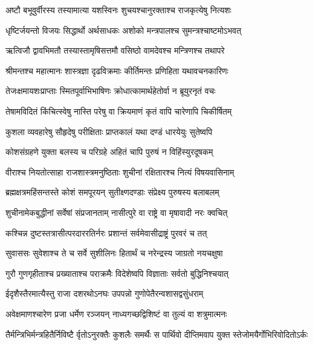 
\twolineshloka
{अष्टौ बभूवुर्वीरस्य तस्यामात्या यशस्विनः}
{शुचयश्चानुरक्ताश्च राजकृत्येषु नित्यशः} %

\twolineshloka
{धृष्टिर्जयन्तो विजयः सिद्धार्थो अर्थसाधकः}
{अशोको मन्त्रपालश्च सुमन्त्रश्चाष्टमोऽभवत्} %

\twolineshloka
{ऋत्विजौ द्वावभिमतौ तस्यास्तामृषिसत्तमौ}
{वसिष्ठो वामदेवश्च मन्त्रिणश्च तथापरे} %

\twolineshloka
{श्रीमन्तश्च महात्मानः शास्त्रज्ञा दृढविक्रमाः}
{कीर्तिमन्तः प्रणिहिता यथावचनकारिणः} %

\twolineshloka
{तेजःक्षमायशःप्राप्ताः स्मितपूर्वाभिभाषिणः}
{क्रोधात्कामार्थहेतोर्वा न ब्रूयुरनृतं वचः} %

\twolineshloka
{तेषामविदितं किंचित्स्वेषु नास्ति परेषु वा}
{क्रियमाणं कृतं वापि चारेणापि चिकीर्षितम्} %

\twolineshloka
{कुशला व्यवहारेषु सौहृदेषु परीक्षिताः}
{प्राप्तकालं यथा दण्डं धारयेयुः सुतेष्वपि} %

\twolineshloka
{कोशसंग्रहणे युक्ता बलस्य च परिग्रहे}
{अहितं चापि पुरुषं न विहिंस्युरदूषकम्} %

\twolineshloka
{वीराश्च नियतोत्साहा राजशास्त्रमनुष्ठिताः}
{शुचीनां रक्षितारश्च नित्यं विषयवासिनाम्} %

\twolineshloka
{ब्रह्मक्षत्रमहिंसन्तस्ते कोशं समपूरयन्}
{सुतीक्ष्णदण्डाः संप्रेक्ष्य पुरुषस्य बलाबलम्} %

\twolineshloka
{शुचीनामेकबुद्धीनां सर्वेषां संप्रजानताम्}
{नासीत्पुरे वा राष्ट्रे वा मृषावादी नरः क्वचित्} %

\twolineshloka
{कश्चिन्न दुष्टस्तत्रासीत्परदाररतिर्नरः}
{प्रशान्तं सर्वमेवासीद्राष्ट्रं पुरवरं च तत्} %

\twolineshloka
{सुवाससः सुवेशाश्च ते च सर्वे सुशीलिनः}
{हितार्थं च नरेन्द्रस्य जाग्रतो नयचक्षुषा} %

\twolineshloka
{गुरौ गुणगृहीताश्च प्रख्याताश्च पराक्रमैः}
{विदेशेष्वपि विज्ञाताः सर्वतो बुद्धिनिश्चयात्} %

\twolineshloka
{ईदृशैस्तैरमात्यैस्तु राजा दशरथोऽनघः}
{उपपन्नो गुणोपेतैरन्वशासद्वसुंधराम्} %

\twolineshloka
{अवेक्षमाणश्चारेण प्रजा धर्मेण रञ्जयन्}
{नाध्यगच्छद्विशिष्टं वा तुल्यं वा शत्रुमात्मनः} %

\fourlineindentedshloka
{तैर्मन्त्रिभिर्मन्त्रहितैर्निविष्टै}
{र्वृतोऽनुरक्तैः कुशलैः समर्थैः}
{स पार्थिवो दीप्तिमवाप युक्त}
{स्तेजोमयैर्गोभिरिवोदितोऽर्कः} %


